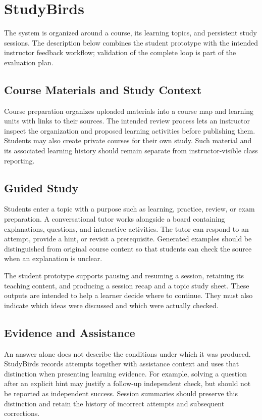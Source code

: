 \section{StudyBirds}
\label{sec:system}

The system is organized around a course, its learning topics, and
persistent study sessions. The description below combines the student
prototype with the intended instructor feedback workflow; validation
of the complete loop is part of the evaluation plan.

\subsection{Course Materials and Study Context}

Course preparation organizes uploaded materials into a course map and
learning units with links to their sources. The intended review process
lets an instructor inspect the organization and proposed learning
activities before publishing them. Students may also create private
courses for their own study. Such material and its associated learning
history should remain separate from instructor-visible class reporting.

\subsection{Guided Study}

Students enter a topic with a purpose such as learning, practice, review,
or exam preparation. A conversational tutor works alongside a board
containing explanations, questions, and interactive activities.
The tutor can respond to an attempt, provide a hint, or revisit a
prerequisite. Generated examples should be distinguished from original
course content so that students can check the source when an explanation
is unclear.

The student prototype supports pausing and resuming a session, retaining
its teaching content, and producing a session recap and a topic study
sheet. These outputs are intended to help a learner decide where to
continue. They must also indicate which ideas were discussed and which
were actually checked.

\subsection{Evidence and Assistance}

An answer alone does not describe the conditions under which it was
produced. StudyBirds records attempts together with assistance context
and uses that distinction when presenting learning evidence. For example,
solving a question after an explicit hint may justify a follow-up
independent check, but should not be reported as independent success.
Session summaries should preserve this distinction and retain the
history of incorrect attempts and subsequent corrections.

